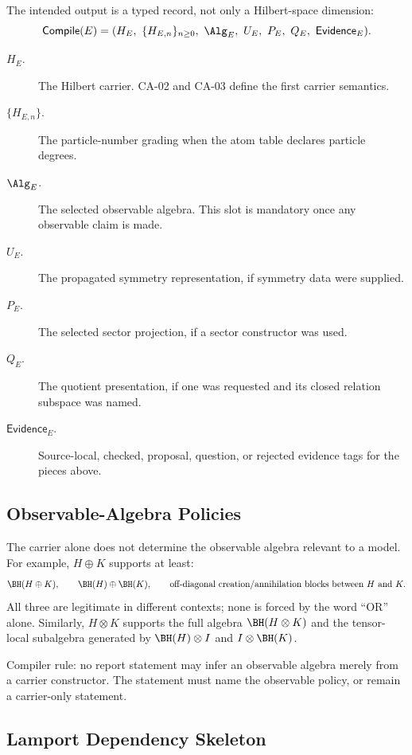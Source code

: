 The intended output is a typed record, not only a Hilbert-space dimension:
\[
  \mathsf{Compile}(E)
  =
  (H_E,\ \{H_{E,n}\}_{n\ge0},\ \Alg_E,\ U_E,\ P_E,\ Q_E,\ \mathsf{Evidence}_E).
\]

\begin{description}
\item[\(H_E\).]
The Hilbert carrier.  CA-02 and CA-03 define the first carrier semantics.
\item[\(\{H_{E,n}\}\).]
The particle-number grading when the atom table declares particle degrees.
\item[\(\Alg_E\).]
The selected observable algebra.  This slot is mandatory once any observable
claim is made.
\item[\(U_E\).]
The propagated symmetry representation, if symmetry data were supplied.
\item[\(P_E\).]
The selected sector projection, if a sector constructor was used.
\item[\(Q_E\).]
The quotient presentation, if one was requested and its closed relation subspace
was named.
\item[\(\mathsf{Evidence}_E\).]
Source-local, checked, proposal, question, or rejected evidence tags for the
pieces above.
\end{description}

\subsection{Observable-Algebra Policies}

The carrier alone does not determine the observable algebra relevant to a model.
For example, \(H\oplus K\) supports at least:
\[
  \BH(H\oplus K),\qquad
  \BH(H)\oplus \BH(K),\qquad
  \text{off-diagonal creation/annihilation blocks between }H\text{ and }K.
\]
All three are legitimate in different contexts; none is forced by the word
``OR'' alone.  Similarly, \(H\otimes K\) supports the full algebra
\(\BH(H\otimes K)\) and the tensor-local subalgebra generated by
\(\BH(H)\otimes I\) and \(I\otimes\BH(K)\).

Compiler rule: no report statement may infer an observable algebra merely from a
carrier constructor.  The statement must name the observable policy, or remain a
carrier-only statement.

\subsection{Lamport Dependency Skeleton}

